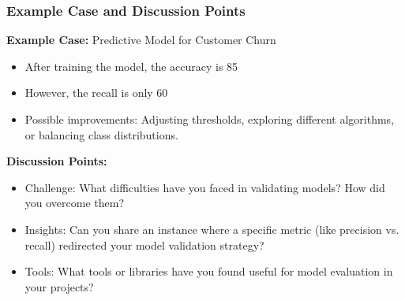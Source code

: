 \documentclass[aspectratio=169]{beamer}
\begin{document}
\begin{frame}[fragile]
    \frametitle{Example Case and Discussion Points}
    \textbf{Example Case:} Predictive Model for Customer Churn
    \begin{itemize}
        \item After training the model, the accuracy is 85%
        \item However, the recall is only 60%
        \item Possible improvements: Adjusting thresholds, exploring different algorithms, or balancing class distributions.
    \end{itemize}
    
    \textbf{Discussion Points:}
    \begin{itemize}
        \item Challenge: What difficulties have you faced in validating models? How did you overcome them?
        \item Insights: Can you share an instance where a specific metric (like precision vs. recall) redirected your model validation strategy?
        \item Tools: What tools or libraries have you found useful for model evaluation in your projects?
    \end{itemize}
\end{frame}
\end{document}
